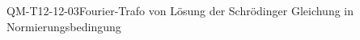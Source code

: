 
\begin{REM}{QM-T12-12-03}{Fourier-Trafo von Lösung der Schrödinger Gleichung in Normierungsbedingung}
\end{REM}
